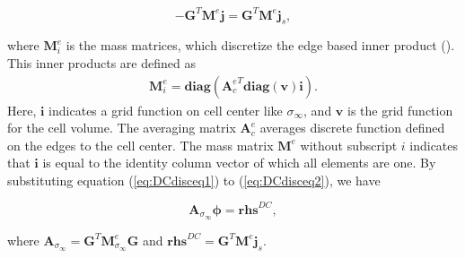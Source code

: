 \documentclass[extra,mreferee]{gji}
\newcommand{\siginf}{\sigma_\infty}
\newcommand{\dgrad}{{\mathbf G}}
\newcommand{\Ace}{{\mathbf A_c^e}}
\newcommand{\diag}{\mathbf{diag}}
\newcommand{\M}{{\mathbf M}}
\newcommand{\MeSigInf}{{\M^e_{\sigma_\infty}}}
\newcommand{\Me}{{\M^e}}
\renewcommand {\dj}  { {\mathbf{j} } }
\newcommand{\vol}{\mathbf{v}}
\newcommand{\A}{\mathbf{A}}
\begin{document}
\begin{linenomath*}
\begin{equation}
  -\dgrad^T \Me\dj = \dgrad^T \Me\dj_s,
  \label{eq:DCdisceq2}
\end{equation}
\end{linenomath*}
where $\mathbf{M}^e_i$ is the mass matrices, which discretize the edge based inner product (\cite{Eldadbook}). This inner products are defined  as
\begin{align}
  \mathbf{M}^e_i = \diag(\Ace^T\diag(\vol)\mathbf{i}).
\end{align}
Here, $\mathbf{i}$ indicates a grid function on cell center like $\siginf$, and $\vol$ is the grid function for the cell volume. The averaging matrix $\Ace$ averages discrete function defined on the edges to the cell center. The mass matrix $\Me$ without subscript $i$ indicates that $\mathbf{i}$ is equal to the identity column vector of which all elements are one. By substituting equation (\ref{eq:DCdisceq1}) to (\ref{eq:DCdisceq2}), we have
\begin{linenomath*}
\begin{equation}
  \A_{\siginf}\boldsymbol{\phi} = \mathbf{rhs}^{DC},
  \label{eq:DCdiscLin}
\end{equation}
\end{linenomath*}
where $\A_{\siginf} = \dgrad^T \MeSigInf\dgrad$ and $\mathbf{rhs}^{DC} = \dgrad^T \Me\dj_s$. 

\end{document}
